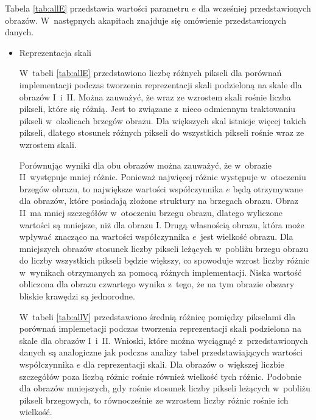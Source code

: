 Tabela \ref{tab:allE} przedstawia wartości parametru $ e $ dla wcześniej przedstawionych obrazów. W~następnych akapitach znajduje się omówienie przedstawionych danych.

\begin{itemize}
\item{Reprezentacja skali}
\label{subsubsec:reprezentacjaSakliTabele}

\nopagebreak
W~tabeli \ref{tab:allE} przedstawiono liczbę różnych pikseli dla porównań implementacji podczas tworzenia reprezentacji skali podzieloną na skale dla obrazów I~i~II. Można zauważyć, że wraz ze wzrostem skali rośnie liczba pikseli, które się różnią. Jest to związane z~nieco odmiennym traktowaniu pikseli w~okolicach brzegów obrazu. Dla większych skal istnieje więcej takich pikseli, dlatego stosunek różnych pikseli do wszystkich pikseli rośnie wraz ze wzrostem skali.

Porównując wyniki dla obu obrazów można zauważyć, że w~obrazie II~występuje mniej różnic. Ponieważ najwięcej różnic występuje w~otoczeniu brzegów obrazu, to największe wartości współczynnika $ e $ będą otrzymywane dla obrazów, które posiadają złożone struktury na brzegach obrazu. Obraz II~ma mniej szczegółów w~otoczeniu brzegu obrazu, dlatego wyliczone wartości są mniejsze, niż dla obrazu I. Drugą własnością obrazu, która może wpływać znacząco na wartości współczynnika $ e $~jest wielkość obrazu. Dla mniejszych obrazów stosunek liczby pikseli leżących w~pobliżu brzegu obrazu do liczby wszystkich pikseli będzie większy, co spowoduje wzrost liczby różnic w~wynikach otrzymanych za pomocą różnych implementacji. Niska wartość obliczona dla obrazu czwartego wynika z~tego, że na tym obrazie obszary bliskie krawędzi są jednorodne.

W~tabeli \ref{tab:allV} przedstawiono średnią różnicę pomiędzy pikselami dla porównań implemetacji podczas tworzenia reprezentacji skali podzielona na skale dla obrazów I~i~II. Wnioski, które można wyciągnąć z~przedstawionych danych są analogiczne jak podczas analizy tabel przedstawiających wartości współczynnika $ e $ dla reprezentacji skali. Dla obrazów o~większej liczbie szczegółów poza liczbą różnic rośnie również wielkość tych różnic. Podobnie dla obrazów mniejszych, gdy rośnie stosunek liczby pikseli leżących w~pobliżu pikseli brzegowych, to równocześnie ze wzrostem liczby różnic rośnie ich wielkość.


\end{itemize}
